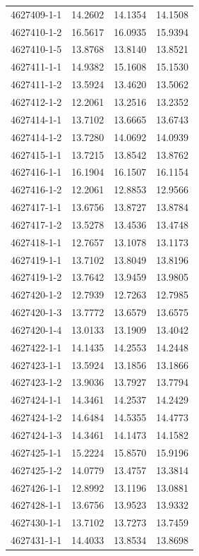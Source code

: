 \begin{longtable}{lrrr}
4627409-1-1 & 14.2602 & 14.1354 & 14.1508 \\
4627410-1-2 & 16.5617 & 16.0935 & 15.9394 \\
4627410-1-5 & 13.8768 & 13.8140 & 13.8521 \\
4627411-1-1 & 14.9382 & 15.1608 & 15.1530 \\
4627411-1-2 & 13.5924 & 13.4620 & 13.5062 \\
4627412-1-2 & 12.2061 & 13.2516 & 13.2352 \\
4627414-1-1 & 13.7102 & 13.6665 & 13.6743 \\
4627414-1-2 & 13.7280 & 14.0692 & 14.0939 \\
4627415-1-1 & 13.7215 & 13.8542 & 13.8762 \\
4627416-1-1 & 16.1904 & 16.1507 & 16.1154 \\
4627416-1-2 & 12.2061 & 12.8853 & 12.9566 \\
4627417-1-1 & 13.6756 & 13.8727 & 13.8784 \\
4627417-1-2 & 13.5278 & 13.4536 & 13.4748 \\
4627418-1-1 & 12.7657 & 13.1078 & 13.1173 \\
4627419-1-1 & 13.7102 & 13.8049 & 13.8196 \\
4627419-1-2 & 13.7642 & 13.9459 & 13.9805 \\
4627420-1-2 & 12.7939 & 12.7263 & 12.7985 \\
4627420-1-3 & 13.7772 & 13.6579 & 13.6575 \\
4627420-1-4 & 13.0133 & 13.1909 & 13.4042 \\
4627422-1-1 & 14.1435 & 14.2553 & 14.2448 \\
4627423-1-1 & 13.5924 & 13.1856 & 13.1866 \\
4627423-1-2 & 13.9036 & 13.7927 & 13.7794 \\
4627424-1-1 & 14.3461 & 14.2537 & 14.2429 \\
4627424-1-2 & 14.6484 & 14.5355 & 14.4773 \\
4627424-1-3 & 14.3461 & 14.1473 & 14.1582 \\
4627425-1-1 & 15.2224 & 15.8570 & 15.9196 \\
4627425-1-2 & 14.0779 & 13.4757 & 13.3814 \\
4627426-1-1 & 12.8992 & 13.1196 & 13.0881 \\
4627428-1-1 & 13.6756 & 13.9523 & 13.9332 \\
4627430-1-1 & 13.7102 & 13.7273 & 13.7459 \\
4627431-1-1 & 14.4033 & 13.8534 & 13.8698 \\

\end{longtable}
